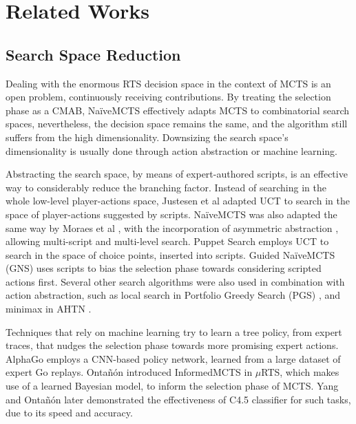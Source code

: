 \documentclass[conference]{IEEEtran}
\newcommand{\mRTS}{$\mu$RTS}
\begin{document}

\section{Related Works}

\subsection{Search Space Reduction}

Dealing with the enormous RTS decision space in the context of MCTS is an open problem, continuously receiving contributions. By treating the selection phase as a CMAB, NaïveMCTS effectively adapts MCTS to combinatorial search spaces, nevertheless, the decision space remains the same, and the algorithm still suffers from the high dimensionality. Downsizing the search space's dimensionality is usually done through action abstraction or machine learning.

Abstracting the search space, by means of expert-authored scripts, is an effective way to considerably reduce the branching factor. Instead of searching in the whole low-level player-actions space, Justesen et al \cite{justesen_script-_2014} adapted UCT to search in the space of player-actions suggested by scripts. NaïveMCTS was also adapted the same way by Moraes et al \cite{moraes_action_2018}, with the incorporation of asymmetric abstraction \cite{moraes_asymmetric_2018}, allowing multi-script and multi-level search. Puppet Search \cite{barriga_puppet_2015} employs UCT to search in the space of choice points, inserted into scripts. Guided NaïveMCTS (GNS) \cite{yang_guiding_2019} uses scripts to bias the selection phase towards considering scripted actions first. Several other search algorithms were also used in combination with action abstraction, such as local search in Portfolio Greedy Search (PGS) \cite{churchill_portfolio_2013}, and minimax in AHTN \cite{ontanon_adversarial_2015}.

Techniques that rely on machine learning try to learn a tree policy, from expert traces, that nudges the selection phase towards more promising expert actions. AlphaGo \cite{silver_mastering_2016} employs a CNN-based policy network, learned from a large dataset of expert Go replays. Ontañón introduced InformedMCTS in \mRTS{}, which makes use of a learned Bayesian model, to inform the selection phase of MCTS. Yang and Ontañón \cite{yang_extracting_2019} later demonstrated the effectiveness of C4.5 classifier for such tasks, due to its speed and accuracy.
\end{document}
